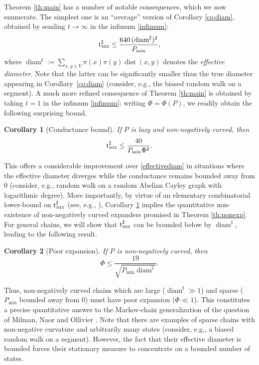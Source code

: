 \documentclass[JEP,XML,SOM,Unicode,NoEqCountersInSection,published]{cedram}
\newtheorem{corollary}{Corollary}
\theoremstyle{definition}
\newcommand{\tmix}{\mathrm{t}_{\textup{\textsc{mix}}}}
\newcommand{\pmin}{P_{\mathrm{min}}}
\DeclareMathOperator{\diam}{diam}
\DeclareMathOperator{\dist}{dist}
\begin{document}
Theorem \ref{th:main} has a number of notable consequences, which we now enumerate. The simplest one is an ``average'' version of Corollary \ref{co:diam}, obtained by sending $t\to\infty$ in the infimum \eqref{infimum}:
\begin{equation}
\label{effectivediam}
\tmix^\sharp \le \frac{640\,(\diam^\sharp)^2}{\pmin},
\end{equation}
where $
\diam^\sharp := \sum_{x,y\in V}\pi(x)\pi(y)\dist(x,y)
$ denotes the \emph{effective diameter}. Note that the latter can be significantly smaller than the true diameter appearing in Corollary~\ref{co:diam} (consider, e.g., the biased random walk on a segment). A much more refined consequence of Theorem \ref{th:main} is obtained by taking $t=1$ in the infimum \eqref{infimum}: writing $\Phi=\Phi(P)$, we readily obtain the following surprising bound.
\begin{corollary}[Conductance bound]\label{co:conductance}If $P$ is lazy and non-negatively curved, then
\begin{equation*}
\tmix^\sharp \le \frac{40}{\pmin\Phi^2}.
\end{equation*}
\end{corollary}
This offers a considerable improvement over \eqref{effectivediam} in situations where the effective diameter diverges while the conductance remains bounded away from $0$ (consider, e.g., random walk on a random Abelian Cayley graph with logarithmic degree). More importantly, by virtue of an elementary combinatorial lower-bound on $\tmix^\sharp$ (see, e.g., \cite[\S 7.1.1]{MR3726904}), Corollary \ref{co:conductance} implies the quantitative non-existence of non-negatively curved expanders promised in Theorem \ref{th:nonexp}. For general chains, we will show that $\tmix^\sharp$ can be bounded below by $\diam^\sharp$, leading to the following result.
\begin{corollary}[Poor expansion]\label{co:expansion}If $P$ is non-negatively curved, then
\begin{equation*}
\Phi \le \frac{19}{\sqrt{\pmin\diam^\sharp}}.
\end{equation*}
\end{corollary}
Thus, non-negatively curved chains which are large ($\diam^\sharp\gg 1$) and sparse ($\pmin$ bounded away from $0$) must have poor expansion ($\Phi\ll 1$). This constitutes a precise quantitative answer to the Markov-chain generalization of the question of Milman, Naor and Ollivier \cite[Probl.\,T]{ollivier2010survey}. Note that there are examples of sparse chains with non-negative curvature and arbitrarily many states (consider, e.g., a biased random walk on a segment). However, the fact that their effective diameter is bounded forces their stationary measure to concentrate on a bounded number of states.
\end{document}
